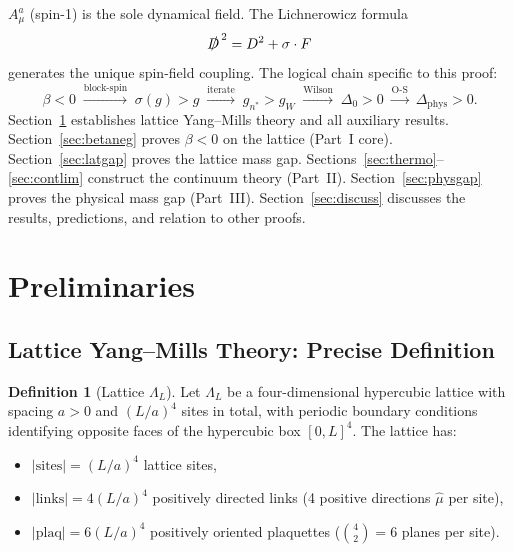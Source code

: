 \documentclass[12pt,a4paper]{article}
\theoremstyle{plain}
\theoremstyle{definition}
\newtheorem{definition}[theorem]{Definition}
\theoremstyle{remark}
\begin{document}
$A_\mu^a$ (spin-1) is the sole dynamical field. The Lichnerowicz formula
\begin{equation}\label{eq:Lich}
\slashed{D}^{\,2}=D^2+\sigma\cdot F
\end{equation}
generates the unique spin-field coupling. The logical chain specific to this proof:
\begin{equation}\label{eq:chain6}
\beta<0 \;\xrightarrow{\text{block-spin}}\;
\sigma(g)>g \;\xrightarrow{\text{iterate}}\;
g_{n^*}>g_W \;\xrightarrow{\text{Wilson}}\;
\Delta_0>0 \;\xrightarrow{\text{O-S}}\;
\Delta_{\mathrm{phys}}>0.
\end{equation}
Section~\ref{sec:prelim} establishes lattice Yang--Mills theory and all auxiliary results. Section~\ref{sec:betaneg} proves $\beta<0$ on the lattice (Part~I core). Section~\ref{sec:latgap} proves the lattice mass gap. Sections~\ref{sec:thermo}--\ref{sec:contlim} construct the continuum theory (Part~II). Section~\ref{sec:physgap} proves the physical mass gap (Part~III). Section~\ref{sec:discuss} discusses the results, predictions, and relation to other proofs.

\section{Preliminaries}\label{sec:prelim}

\subsection{Lattice Yang--Mills Theory: Precise Definition}\label{sec:lattice}

\begin{definition}[Lattice $\Lambda_L$]\label{def:lattice}
Let $\Lambda_L$ be a four-dimensional hypercubic lattice with spacing $a>0$ and $(L/a)^4$ sites in total, with periodic boundary conditions identifying opposite faces of the hypercubic box $[0,L]^4$. The lattice has:
\begin{itemize}[nosep]
\item $|\mathrm{sites}| = (L/a)^4$ lattice sites,
\item $|\mathrm{links}| = 4(L/a)^4$ positively directed links (4 positive directions $\hat\mu$ per site),
\item $|\mathrm{plaq}| = 6(L/a)^4$ positively oriented plaquettes ($\binom{4}{2}=6$ planes per site).
\end{itemize}
\end{definition}
\end{document}
